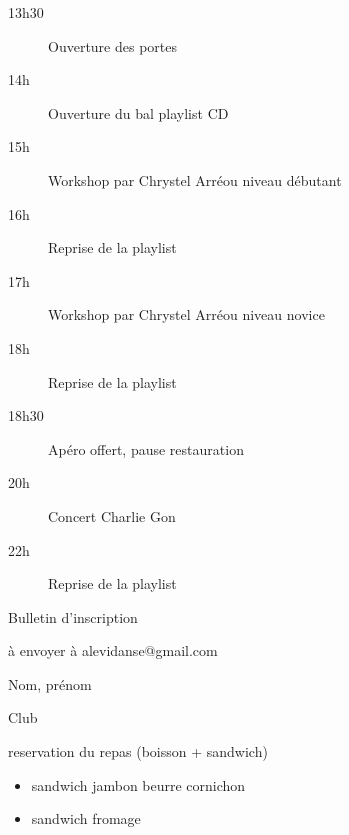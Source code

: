 \documentclass[12pt,a4paper]{article}
\begin{document}
\begin{description}
\item[13h30] Ouverture des portes
\item[14h] Ouverture du bal playlist CD
\item[15h] Workshop par Chrystel Arréou niveau débutant
\item[16h] Reprise de la playlist
\item[17h] Workshop par Chrystel Arréou niveau novice
\item[18h] Reprise de la playlist
\item[18h30] Apéro offert, pause restauration
\item[20h] Concert Charlie Gon
\item[22h] Reprise de la playlist
\end{description}

\vfill

\begin{center}
Bulletin d'inscription
\end{center}

à envoyer à alevidanse@gmail.com

Nom, prénom

Club

reservation du repas (boisson + sandwich)

\begin{itemize}
\item sandwich jambon beurre cornichon
\item sandwich fromage
\end{itemize}
\end{document}

